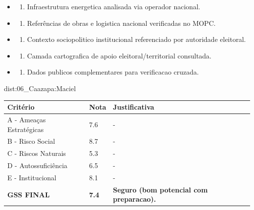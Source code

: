 {\begin{itemize}
\item
  \begin{enumerate}
  \def\labelenumi{\arabic{enumi})}
  \setcounter{enumi}{7}
  \tightlist
  \item
    Infraestrutura energetica analisada via operador nacional.
  \end{enumerate}
\item
  \begin{enumerate}
  \def\labelenumi{\arabic{enumi})}
  \setcounter{enumi}{8}
  \tightlist
  \item
    Referências de obras e logistica nacional verificadas no MOPC.
  \end{enumerate}
\item
  \begin{enumerate}
  \def\labelenumi{\arabic{enumi})}
  \setcounter{enumi}{9}
  \tightlist
  \item
    Contexto sociopolitico institucional referenciado por autoridade
    eleitoral.
  \end{enumerate}
\item
  \begin{enumerate}
  \def\labelenumi{\arabic{enumi})}
  \setcounter{enumi}{10}
  \tightlist
  \item
    Camada cartografica de apoio eleitoral/\allowbreak territorial consultada.
  \end{enumerate}
\item
  \begin{enumerate}
  \def\labelenumi{\arabic{enumi})}
  \setcounter{enumi}{11}
  \tightlist
  \item
    Dados publicos complementares para verificacao cruzada.
  \end{enumerate}
\end{itemize}}{dist:06_Caazapa:Maciel}
\begin{table}[ht!]
\small \begin{tabular}{p{3.0cm}p{0.8cm}p{6.0cm}} \toprule
\textbf{Critério} & \textbf{Nota} & \textbf{Justificativa} \\ \midrule
A - Ameaças Estratégicas & 7.6 & - \\
B - Risco Social & 8.7 & - \\
C - Riscos Naturais & 5.3 & - \\
D - Autossuficiência & 6.5 & - \\
E - Institucional & 8.1 & - \\
\midrule \textbf{GSS FINAL} & \textbf{7.4} & \textbf{Seguro (bom potencial com preparacao).} \\ \bottomrule \end{tabular}
\end{table}
